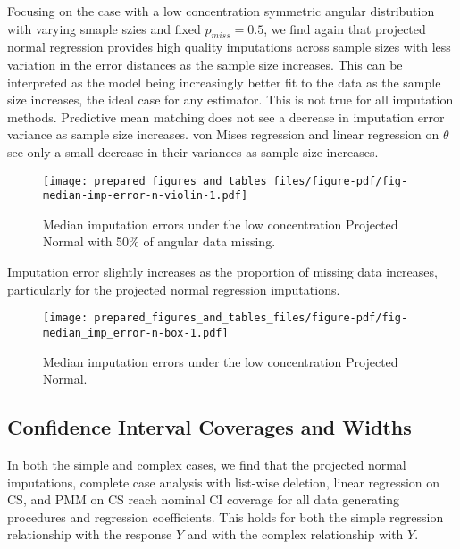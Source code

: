 \documentclass[
]{article}
\begin{document}
Focusing on the case with a low concentration symmetric angular
distribution with varying smaple szies and fixed \(p_{miss} = 0.5\), we
find again that projected normal regression provides high quality
imputations across sample sizes with less variation in the error
distances as the sample size increases. This can be interpreted as the
model being increasingly better fit to the data as the sample size
increases, the ideal case for any estimator. This is not true for all
imputation methods. Predictive mean matching does not see a decrease in
imputation error variance as sample size increases. von Mises regression
and linear regression on \(\theta\) see only a small decrease in their
variances as sample size increases.

\begin{figure}

{\centering \texttt{[image: prepared\_figures\_and\_tables\_files/figure-pdf/fig-median-imp-error-n-violin-1.pdf]}

}

\caption{\label{fig-median-imp-error-n-violin}Median imputation errors
under the low concentration Projected Normal with 50\% of angular data
missing.}

\end{figure}

Imputation error slightly increases as the proportion of missing data
increases, particularly for the projected normal regression imputations.

\begin{figure}

{\centering \texttt{[image: prepared\_figures\_and\_tables\_files/figure-pdf/fig-median\_imp\_error-n-box-1.pdf]}

}

\caption{\label{fig-median_imp_error-n-box}Median imputation errors
under the low concentration Projected Normal.}

\end{figure}

\hypertarget{confidence-interval-coverages-and-widths}{%
\subsection{Confidence Interval Coverages and
Widths}\label{confidence-interval-coverages-and-widths}}

In both the simple and complex cases, we find that the projected normal
imputations, complete case analysis with list-wise deletion, linear
regression on CS, and PMM on CS reach nominal CI coverage for all data
generating procedures and regression coefficients. This holds for both
the simple regression relationship with the response \(Y\) and with the
complex relationship with \(Y\).
\end{document}
